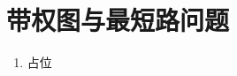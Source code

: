 \documentclass[../../main.tex]{subfiles}
\begin{document}
\section{带权图与最短路问题}
\begin{enumerate}
    \item 占位
\end{enumerate}
\end{document}
